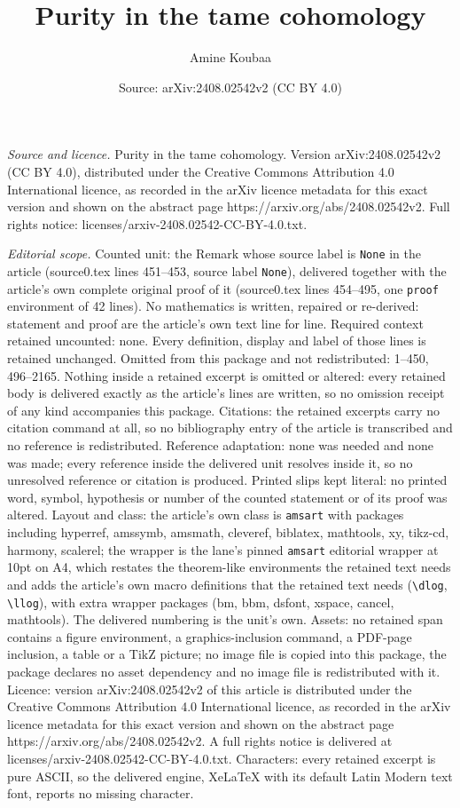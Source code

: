 \documentclass[10pt,a4paper]{amsart}
\title[Purity in the tame cohomology]{Purity in the tame cohomology}
\author{Amine Koubaa}
\date{Source: arXiv:2408.02542v2 (CC BY 4.0)}
\begin{document}
\maketitle

\noindent\emph{Source and licence.} Purity in the tame cohomology. Version arXiv:2408.02542v2 (CC BY 4.0), distributed under the Creative Commons Attribution 4.0 International licence, as recorded in the arXiv licence metadata for this exact version and shown on the abstract page https://arxiv.org/abs/2408.02542v2. Full rights notice: licenses/arxiv-2408.02542-CC-BY-4.0.txt.\par\smallskip

\noindent\textit{Editorial scope.} Counted unit: the Remark whose source label is \texttt{None} in the article (source0.tex lines 451--453, source label \texttt{None}), delivered together with the article's own complete original proof of it (source0.tex lines 454--495, one \texttt{proof} environment of 42 lines). No mathematics is written, repaired or re-derived: statement and proof are the article's own text line for line. Required context retained uncounted: none. Every definition, display and label of those lines is retained unchanged. Omitted from this package and not redistributed: 1--450, 496--2165. Nothing inside a retained excerpt is omitted or altered: every retained body is delivered exactly as the article's lines are written, so no omission receipt of any kind accompanies this package. Citations: the retained excerpts carry no citation command at all, so no bibliography entry of the article is transcribed and no reference is redistributed. Reference adaptation: none was needed and none was made; every reference inside the delivered unit resolves inside it, so no unresolved reference or citation is produced. Printed slips kept literal: no printed word, symbol, hypothesis or number of the counted statement or of its proof was altered. Layout and class: the article's own class is \texttt{amsart} with packages including hyperref, amssymb, amsmath, cleveref, biblatex, mathtools, xy, tikz-cd, harmony, scalerel; the wrapper is the lane's pinned \texttt{amsart} editorial wrapper at 10pt on A4, which restates the theorem-like environments the retained text needs and adds the article's own macro definitions that the retained text needs (\texttt{\textbackslash dlog}, \texttt{\textbackslash llog}), with extra wrapper packages (bm, bbm, dsfont, xspace, cancel, mathtools). The delivered numbering is the unit's own. Assets: no retained span contains a figure environment, a graphics-inclusion command, a PDF-page inclusion, a table or a TikZ picture; no image file is copied into this package, the package declares no asset dependency and no image file is redistributed with it. Licence: version arXiv:2408.02542v2 of this article is distributed under the Creative Commons Attribution 4.0 International licence, as recorded in the arXiv licence metadata for this exact version and shown on the abstract page https://arxiv.org/abs/2408.02542v2. A full rights notice is delivered at licenses/arxiv-2408.02542-CC-BY-4.0.txt. Characters: every retained excerpt is pure ASCII, so the delivered engine, XeLaTeX with its default Latin Modern text font, reports no missing character.
\end{document}

